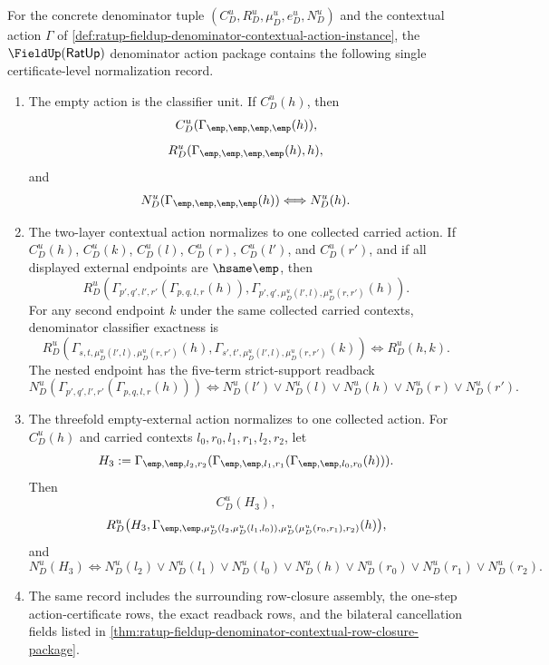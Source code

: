 \begin{theorem}
\label{thm:ratup-fieldup-denominator-contextual-action-total-normalization-package}
For the concrete denominator tuple
$(C_D^u,R_D^u,\mu_D^u,e_D^u,N_D^u)$ and the contextual action $\Gamma$ of
\autoref{def:ratup-fieldup-denominator-contextual-action-instance}, the
$\FieldUp(\mathsf{RatUp})$ denominator action package contains the following
single certificate-level normalization record.

\begin{enumerate}
\item The empty action is the classifier unit. If $C_D^u(h)$, then
$$
C_D^u(\Gamma_{\emp,\emp,\emp,\emp}(h)),
$$
$$
R_D^u(\Gamma_{\emp,\emp,\emp,\emp}(h),h),
$$
and
$$
N_D^u(\Gamma_{\emp,\emp,\emp,\emp}(h))
\Longleftrightarrow
N_D^u(h).
$$

\item The two-layer contextual action normalizes to one collected carried action.
If $C_D^u(h)$, $C_D^u(k)$, $C_D^u(l)$, $C_D^u(r)$, $C_D^u(l')$, and
$C_D^u(r')$, and if all displayed external endpoints are $\hsame\emp$, then
$$
R_D^u(\Gamma_{p',q',l',r'}(\Gamma_{p,q,l,r}(h)),
\Gamma_{p',q',\mu_D^u(l',l),\mu_D^u(r,r')}(h)).
$$
For any second endpoint $k$ under the same collected carried contexts,
denominator classifier exactness is
$$
R_D^u(\Gamma_{s,t,\mu_D^u(l',l),\mu_D^u(r,r')}(h),
\Gamma_{s',t',\mu_D^u(l',l),\mu_D^u(r,r')}(k))
\Longleftrightarrow R_D^u(h,k).
$$
The nested endpoint has the five-term strict-support readback
$$
N_D^u(\Gamma_{p',q',l',r'}(\Gamma_{p,q,l,r}(h)))
\Longleftrightarrow
N_D^u(l')\lor N_D^u(l)\lor N_D^u(h)\lor N_D^u(r)\lor N_D^u(r').
$$

\item The threefold empty-external action normalizes to one collected action.
For $C_D^u(h)$ and carried contexts $l_0,r_0,l_1,r_1,l_2,r_2$, let
$$
H_3:=
\Gamma_{\emp,\emp,l_2,r_2}
(\Gamma_{\emp,\emp,l_1,r_1}(\Gamma_{\emp,\emp,l_0,r_0}(h))).
$$
Then
$$
C_D^u(H_3),
$$
$$
R_D^u\bigl(H_3,
\Gamma_{\emp,\emp,\mu_D^u(l_2,\mu_D^u(l_1,l_0)),
\mu_D^u(\mu_D^u(r_0,r_1),r_2)}(h)\bigr),
$$
and
$$
N_D^u(H_3)
\Longleftrightarrow
N_D^u(l_2)\lor N_D^u(l_1)\lor N_D^u(l_0)\lor N_D^u(h)
\lor N_D^u(r_0)\lor N_D^u(r_1)\lor N_D^u(r_2).
$$

\item The same record includes the surrounding row-closure assembly, the one-step
action-certificate rows, the exact readback rows, and the bilateral cancellation
fields listed in
\autoref{thm:ratup-fieldup-denominator-contextual-row-closure-package}.
\end{enumerate}
\end{theorem}
